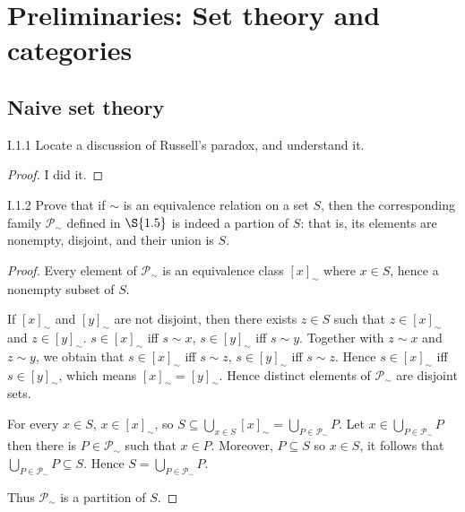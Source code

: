 \chapter{Preliminaries: Set theory and categories}

\section{Naive set theory}

\begin{exercise}{I.1.1}
	Locate a discussion of Russell's paradox, and understand it.
\end{exercise}

\begin{proof}
	I did it.
\end{proof}

\begin{exercise}{I.1.2}
	Prove that if $\sim$ is an equivalence relation on a set $S$, then the corresponding family $\mathscr{P}_{\sim}$ defined in $\S{1.5}$ is indeed a partion of $S$: that is, its elements are nonempty, disjoint, and their union is $S$.
\end{exercise}

\begin{proof}
	Every element of $\mathscr{P}_{\sim}$ is an equivalence class ${[x]}_{\sim}$ where $x\in S$, hence a nonempty subset of $S$.

	If ${[x]}_{\sim}$ and ${[y]}_{\sim}$ are not disjoint, then there exists $z\in S$ such that $z \in {[x]}_{\sim}$ and $z \in {[y]}_{\sim}$. $s\in {[x]}_{\sim}$ iff $s \sim x$, $s\in {[y]}_{\sim}$ iff $s \sim y$. Together with $z \sim x$ and $z \sim y$, we obtain that $s\in {[x]}_{\sim}$ iff $s \sim z$, $s\in {[y]}_{\sim}$ iff $s \sim z$. Hence $s\in {[x]}_{\sim}$ iff $s\in {[y]}_{\sim}$, which means ${[x]}_{\sim} = {[y]}_{\sim}$. Hence distinct elements of $\mathscr{P}_{\sim}$ are disjoint sets.

	For every $x\in S$, $x \in {[x]}_{\sim}$, so $S \subseteq \bigcup_{x\in S}{[x]}_{\sim} = \bigcup_{P\in \mathscr{P}_{\sim}}P$. Let $x\in \bigcup_{P\in \mathscr{P}_{\sim}}P$ then there is $P\in \mathscr{P}_{\sim}$ such that $x\in P$. Moreover, $P\subseteq S$ so $x\in S$, it follows that $\bigcup_{P\in \mathscr{P}_{\sim}}P \subseteq S$. Hence $S = \bigcup_{P\in \mathscr{P}_{\sim}}P$.

	Thus $\mathscr{P}_{\sim}$ is a partition of $S$.
\end{proof}

